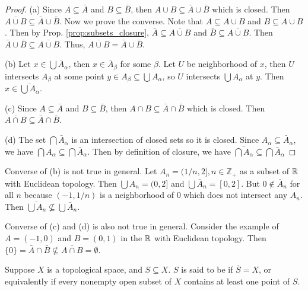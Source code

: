 \documentclass[11pt,a4paper]{article}
\begin{document}
\begin{proof}
(a) Since $A\subseteq \bar{A}$ and $B\subseteq \bar{B}$, then $A\cup B\subseteq \bar{A}\cup \bar{B}$ which is closed. Then $\overline{A\cup B}\subseteq \bar{A}\cup\bar{B}$. Now we prove the converse. Note that $A\subseteq A\cup B$ and $B\subseteq A\cup B$. Then by Prop. \ref{prop:subsets_closure}, $\bar{A}\subseteq \overline{A\cup B}$ and $\bar{B}\subseteq \overline{A\cup B}$. Then $\bar{A}\cup\bar{B}\subseteq \overline{A\cup B}$. Thus, $\overline{A\cup B} = \bar{A}\cup \bar{B}$.

\noindent(b) Let $x\in \bigcup \bar{A}_\alpha$, then $x\in \bar{A}_\beta$ for some $\beta$. Let $U$ be neighborhood of $x$, then $U$ intersects $A_\beta$ at some point $y\in A_\beta\subseteq \bigcup A_\alpha$, so $U$ intersects $\bigcup A_\alpha$ at $y$. Then $x\in \overline{\bigcup A_\alpha}$.

\noindent(c) Since $A\subseteq \bar{A}$ and $B\subseteq \bar{B}$, then $A\cap B\subseteq \bar{A}\cap \bar{B}$ which is closed. Then $\overline{A\cap B}\subseteq \bar{A}\cap\bar{B}$.

\noindent(d) The set $\bigcap \bar{A}_\alpha$ is an intersection of closed sets so it is closed. Since $A_\alpha\subseteq \bar{A}_\alpha$, we have $\bigcap A_\alpha \subseteq \bigcap \bar{A}_\alpha$. Then by definition of closure, we have $\overline{\bigcap A_\alpha} \subseteq \bigcap \bar{A}_\alpha$
\end{proof}

\begin{remark}
Converse of (b) is not true in general. Let $A_n = (1/n,2], n\in \mathbb{Z}_+$ as a subset of $\mathbb{R}$ with Euclidean topology. Then $\bigcup A_n = (0,2]$ and $\bigcup \bar{A}_n = [0,2]$. 
But $0\notin \bar{A}_n$ for all $n$ because $(-1,1/n)$ is a neighborhood of $0$ which does not intersect any $A_n$. 
Then $\overline{\bigcup A_n}\nsubseteq \bigcup\bar{A}_n$.

\noindent Converse of (c) and (d) is also not true in general. Consider the example of $A = (-1,0)$ and $B = (0,1)$ in the $\mathbb{R}$ with Euclidean topology. Then $\{0\} = \bar{A}\cap\bar{B} \nsubseteq \overline{A\cap B} = \emptyset$.
\end{remark}

\begin{definition}
Suppose $X$ is a topological space, and $S\subseteq X$. $S$ is said to be  if $\bar{S}=X$, or equivalently if every nonempty open subset of $X$ contains at least one point of $S$.
\end{definition}
\end{document}
